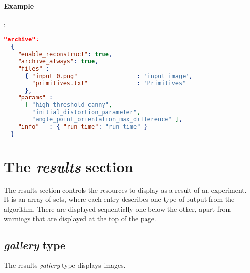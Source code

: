\paragraph{Example}:\\
\begin{lstlisting}[language=json,firstnumber=1]
"archive":
  {
    "enable_reconstruct": true,
    "archive_always": true,
    "files" : 
      { "input_0.png"                 : "input image",
        "primitives.txt"              : "Primitives"
      },
    "params" :  
      [ "high_threshold_canny", 
        "initial_distortion_parameter", 
        "angle_point_orientation_max_difference" ],
    "info"   : { "run_time": "run time" }
  }
\end{lstlisting}

\section{The \emph{results} section}


The results section controls the resources to display as a result of an experiment.
It is an array of sets, where each entry describes one type of output from the algorithm.
There are 
displayed sequentially one below the other, apart from warnings that are 
displayed at the top of the page.

\subsection{ \emph{gallery} type}

The results \emph{gallery} type displays images.

